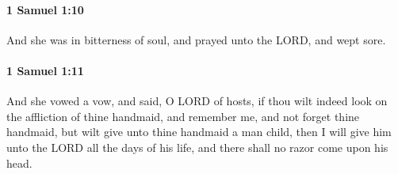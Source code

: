 		\paragraph{1 Samuel 1:10} %
			\label{1SAMUEL-1-10}

			And she was in bitterness of soul, and prayed unto the LORD, and wept sore.


		\paragraph{1 Samuel 1:11} %
			\label{1SAMUEL-1-11}

			And she vowed a vow, and said, O LORD of hosts, if thou wilt indeed look on the affliction of thine handmaid, and remember me, and not forget thine handmaid, but wilt give unto thine handmaid a man child, then I will give him unto the LORD all the days of his life, and there shall no razor come upon his head.

